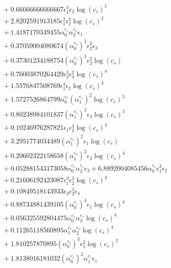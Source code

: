 \documentclass[10pt]{article}
\begin{document}
\begin{align*}
&{}  + 0.66666666666667 \epsilon_{1}^{4} \epsilon_{2} \log{\left(c_{s} \right)}^{5} \\
&{}  + 2.8202591913185 \epsilon_{1}^{2} \epsilon_{2}^{3} \log{\left(c_{s} \right)}^{2} \\
&{}  + 1.4187170349455 \alpha_{0}^{c_s} \alpha_{2}^{c_s} \epsilon_{1} \\
&{}  + 0.37059004080674 \left(\alpha_{0}^{c_s}\right)^{2} \epsilon_{2}^{2} \epsilon_{3} \\
&{}  + 0.37301234188754 \left(\alpha_{0}^{c_s}\right)^{3} \epsilon_{2}^{2} \log{\left(c_{s} \right)} \\
&{}  + 0.76003870264429 \epsilon_{2}^{3} \epsilon_{3}^{2} \log{\left(c_{s} \right)}^{4} \\
&{}  + 1.5576847508769 \epsilon_{1}^{4} \epsilon_{2} \log{\left(c_{s} \right)}^{3} \\
&{}  + 1.5727526864799 \alpha_{0}^{c_s} \left(\alpha_{1}^{c_s}\right)^{2} \log{\left(c_{s} \right)}^{3} \\
&{}  + 0.80238984101837 \left(\alpha_{1}^{c_s}\right)^{2} \epsilon_{2} \log{\left(c_{s} \right)}^{3} \\
&{}  + 0.10246976287821 \epsilon_{1} \epsilon_{2}^{4} \log{\left(c_{s} \right)}^{4} \\
&{}  + 3.2951774034489 \left(\alpha_{1}^{c_s}\right)^{2} \epsilon_{1} \log{\left(c_{s} \right)} \\
&{}  + 0.20602322158658 \left(\alpha_{1}^{c_s}\right)^{2} \epsilon_{2} \log{\left(c_{s} \right)}^{4} \\
&{}  + 0.052881543173058 \alpha_{0}^{c_s} \alpha_{2}^{c_s} \epsilon_{2} + 6.8892004085456 \alpha_{0}^{c_s} \epsilon_{1}^{3} \epsilon_{2} \\
&{}  + 0.21606192423087 \epsilon_{1}^{3} \epsilon_{2}^{2} \log{\left(c_{s} \right)}^{4} \\
&{}  + 0.10849518143933 \epsilon_{2} \epsilon_{3}^{3} \epsilon_{4} \\
&{}  + 0.88734881439105 \left(\alpha_{0}^{c_s}\right)^{4} \epsilon_{1} \log{\left(c_{s} \right)}^{4} \\
&{}  + 0.056325592804475 \alpha_{0}^{c_s} \alpha_{3}^{c_s} \log{\left(c_{s} \right)}^{4} \\
&{}  + 0.11265118560895 \alpha_{1}^{c_s} \alpha_{2}^{c_s} \log{\left(c_{s} \right)}^{4} \\
&{}  + 1.810257870895 \left(\alpha_{0}^{c_s}\right)^{3} \epsilon_{1}^{2} \log{\left(c_{s} \right)}^{2} \\
&{}  + 1.8138016181032 \left(\alpha_{0}^{c_s}\right)^{2} \alpha_{1}^{c_s} \epsilon_{1} \\

\end{align*}
\end{document}
